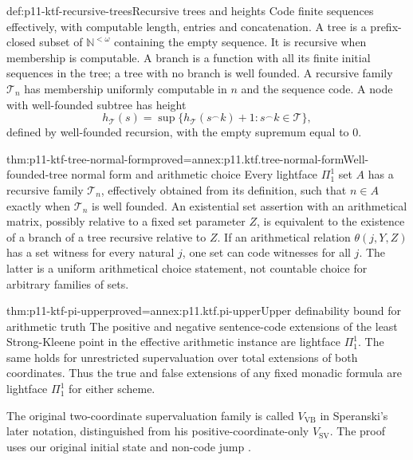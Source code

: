 \begin{hbdefinition}{def:p11-ktf-recursive-trees}{Recursive trees and heights}
Code finite sequences effectively, with computable length, entries and
concatenation. A tree is a prefix-closed subset of
\(\mathbb N^{<\omega}\) containing the empty sequence. It is recursive
when membership is computable. A branch is a function with all its finite
initial sequences in the tree; a tree with no branch is well founded.
A recursive family \(\mathcal T_n\) has membership uniformly computable
in \(n\) and the sequence code. A node with well-founded subtree has height
\[
 h_{\mathcal T}(s)=\sup\{h_{\mathcal T}(s\mathbin{{}^\frown}k)+1:
                         s\mathbin{{}^\frown}k\in\mathcal T\},
\]
defined by well-founded recursion, with the empty supremum equal to \(0\).
\end{hbdefinition}

\begin{hblemma}{thm:p11-ktf-tree-normal-form}{proved=annex:p11.ktf.tree-normal-form}{Well-founded-tree normal form and arithmetic choice}
Every lightface \(\Pi^1_1\) set \(A\) has a recursive family
\(\mathcal T_n\), effectively obtained from its definition, such that
\(n\in A\) exactly when \(\mathcal T_n\) is well founded.
An existential set assertion with an arithmetical matrix, possibly relative
to a fixed set parameter \(Z\), is equivalent to the existence of a
branch of a tree recursive relative to \(Z\). If an arithmetical relation
\(\theta(j,Y,Z)\) has a set witness for every natural \(j\), one set
can code witnesses for all \(j\). The latter is a uniform arithmetical
choice statement, not countable choice for arbitrary families of sets.
\end{hblemma}

\begin{hbtheorem}{thm:p11-ktf-pi-upper}{proved=annex:p11.ktf.pi-upper}{Upper definability bound for arithmetic truth}
The positive and negative sentence-code extensions of the least
Strong-Kleene point in the effective arithmetic instance are lightface
\(\Pi^1_1\). The same holds for unrestricted supervaluation over
total extensions of both coordinates. Thus the true and false extensions
of any fixed monadic formula are lightface \(\Pi^1_1\) for either scheme.
\end{hbtheorem}

The original two-coordinate supervaluation family is called
\(V_{\mathrm{VB}}\) in Speranski's later notation, distinguished from
his positive-coordinate-only \(V_{\mathrm{SV}}\). The proof uses our
original initial state and non-code jump
\cite[\S\S2.1,3.1]{Speranski2017TruthAuthorPreprint}.

